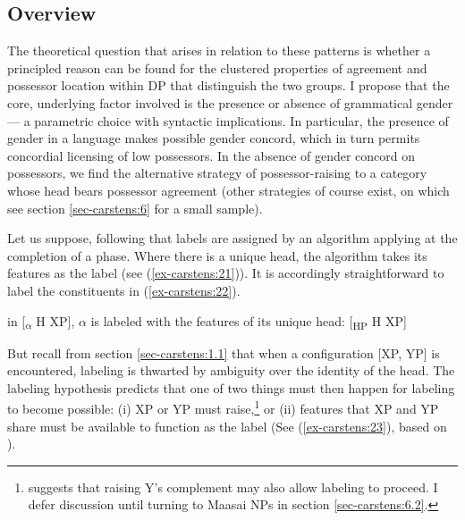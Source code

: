 \documentclass[output=paper
,modfonts
,nonflat]{langsci/langscibook}
\begin{document}
\subsection{Overview} \label{sec-carstens:3.1}
The theoretical question that arises in relation to these patterns is whether a principled reason can be found for the clustered properties of agreement and possessor location within DP that distinguish the two groups. I propose that the core, underlying factor involved is the presence or absence of grammatical gender --- a parametric choice with syntactic implications. In particular, the presence of gender in a language makes possible gender concord, which in turn permits concordial licensing of low possessors. In the absence of gender concord on possessors, we find the alternative strategy of possessor-raising to a category whose head bears possessor agreement (other strategies of course exist, on which see section \ref{sec-carstens:6} for a small sample). 

Let us suppose, following \citet{Chomsky2013, Chomsky2015} that labels are assigned by an algorithm applying at the completion of a phase. Where there is a unique head, the algorithm takes its features as the label (see (\ref{ex-carstens:21})). It is accordingly straightforward to label the constituents in (\ref{ex-carstens:22}).

\begin{exe}
\ex\label{ex-carstens:21} in [\textsubscript{$\alpha$} H XP], $\alpha$ is labeled with the features of its unique head: [\textsubscript{HP} H XP] 
\end{exe}
\begin{exe}
	\ex\label{ex-carstens:22} 
\end{exe}
But recall from section \ref{sec-carstens:1.1} that when a configuration [XP, YP] is encountered, labeling is thwarted by ambiguity over the identity of the head. The labeling hypothesis predicts that one of two things must then happen for labeling to become possible: (i) XP or YP must raise,\footnote{\citet{Chomsky2015} suggests that raising Y’s complement may also allow labeling to proceed. I defer discussion until turning to Maasai NPs in section \ref{sec-carstens:6.2}.}  or (ii) features that XP and YP share must be available to function as the label (See  (\ref{ex-carstens:23}), based on \citealt[44]{Chomsky2013}).
\end{document}
